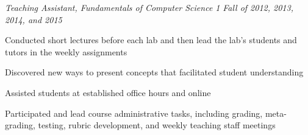 \headerrow
{\emph{Teaching Assistant, Fundamentals of Computer Science 1}}
{\emph{Fall of 2012, 2013, 2014, and 2015}}
\begin{itemize*}

    \item Conducted short lectures before each lab and then lead the lab's
    students and tutors in the weekly assignments
    \item Discovered new ways to present concepts that facilitated student
    understanding
    \item Assisted students at established office hours and online
    \item Participated and lead course administrative tasks, including grading,
    meta-grading, testing, rubric development, and weekly teaching staff
    meetings
\end{itemize*}
